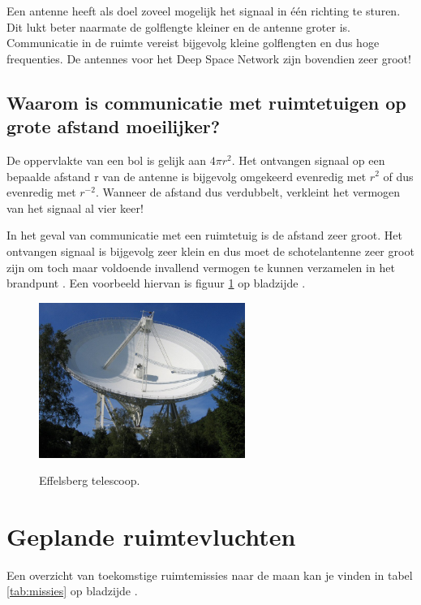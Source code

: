 Een antenne heeft als doel zoveel mogelijk het signaal in één richting te sturen. Dit lukt beter naarmate de golflengte kleiner en de antenne groter is. Communicatie in de ruimte vereist bijgevolg kleine golflengten en dus hoge frequenties. De antennes voor het Deep Space Network zijn bovendien zeer groot!

\subsection{Waarom is communicatie met ruimtetuigen op grote afstand moeilijker?}

De oppervlakte van een bol is gelijk aan $4\pi r^{2}$. Het ontvangen signaal op een bepaalde afstand r van de antenne is bijgevolg omgekeerd evenredig met $r^{2}$ of dus evenredig met $r^{-2}$. Wanneer de afstand dus verdubbelt, verkleint het vermogen van het signaal al vier keer!

In het geval van communicatie met een ruimtetuig is de afstand zeer groot. Het ontvangen signaal is bijgevolg zeer klein en dus moet de schotelantenne zeer groot zijn om toch maar voldoende invallend vermogen te kunnen verzamelen in het brandpunt \cite{radiocontact}. Een voorbeeld hiervan is figuur \ref{fig:effelsberg} op bladzijde \pageref{fig:effelsberg}.

\begin{figure}[ht]
  \centering
  \includegraphics[width=0.6\textwidth]{voorbeeld_figuren/paraboolantenne}
  \caption{Effelsberg telescoop.}
  \cite{effelsberg}
  \label{fig:effelsberg}
\end{figure}

\section{Geplande ruimtevluchten}

Een overzicht van toekomstige ruimtemissies naar de maan kan je vinden in tabel \ref{tab:missies} op bladzijde \pageref{tab:missies}.

